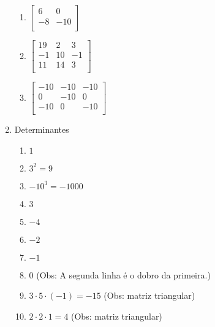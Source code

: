 \documentclass[a4paper]{article}
\begin{document}
\begin{multicols}{2}
\begin{enumerate}
\begin{enumerate}
    \item 
      $
      \begin{bmatrix}
        6 & 0\\
        -8 & -10\\
      \end{bmatrix}
      $

    \item 
      $
      \begin{bmatrix}
        19 & 2 & 3\\
        -1 & 10 & -1\\
        11 & 14 & 3\\
      \end{bmatrix}
      $


    \item 
      $
      \begin{bmatrix}
        -10 & -10 & -10\\
        0 & -10 & 0\\
        -10 & 0 & -10\\
      \end{bmatrix}
      $

    \end{enumerate}

  \item Determinantes

    \begin{enumerate}
    \item $1$
      
    \item $ 3^2 = 9$

    \item $ -10^3 = -1000$

    \item $ 3 $
      
    \item $ -4 $

    \item $ -2 $

    \item $ -1 $

    \item $ 0 $ (Obs: A segunda linha é o dobro da primeira.)

    \item $  3 \cdot 5\cdot (-1) = -15 $ (Obs: matriz triangular)

    \item $ 2\cdot 2 \cdot 1 = 4 $ (Obs: matriz triangular)


\end{enumerate}
\end{enumerate}
\end{multicols}
\end{document}
